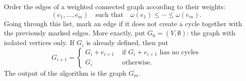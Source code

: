 \begin{thm}
Order the edges of a weighted connected graph according to their weights:
\[
(e_1, \ldots, e_m) \quad \text{such that} \quad \omega(e_1) \le \cdots \le \omega(e_m).
\]
Going through this list, mark an edge if it does not create a cycle together with the previously marked edges.
More exactly, put $G_0 = (V, \emptyset)$: the graph with isolated vertices only.
If $G_i$ is already defined, then put
\[
G_{i+1} =
\begin{cases}
G_i + e_{i+1} &\text{ if } G_i + e_{i+1} \text{ has no cycles}\\
G_i &\text{ otherwise.}
\end{cases}
\]
The output of the algorithm is the graph $G_m$.
\end{thm}